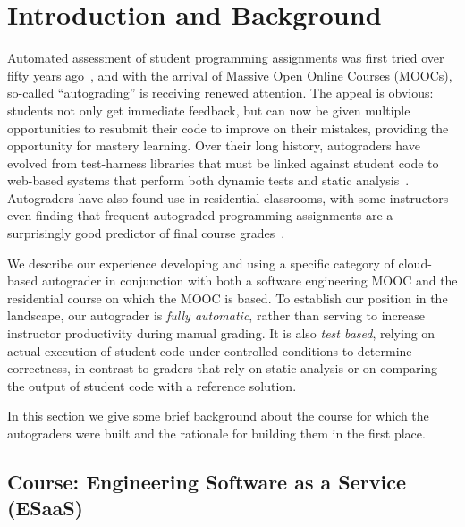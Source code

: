 \section{Introduction and Background}

Automated assessment of student programming assignments was first tried
over fifty years ago~\cite{hollingsworth60}, and with the arrival of
Massive Open Online Courses (MOOCs), so-called ``autograding'' is
receiving renewed attention.  The appeal is obvious: students not only
get immediate feedback, but can now be given multiple opportunities to
resubmit their code to improve on their mistakes, providing the
opportunity for mastery learning.  Over their long history, autograders
have evolved from test-harness libraries that must be linked against
student code to web-based systems that perform both dynamic tests and static
analysis~\cite{douce-2005-autograding-survey}.  Autograders have also
found use in residential classrooms, with some instructors even finding
that frequent autograded programming assignments are a surprisingly good
predictor of final course grades~\cite{navrat2014}.

We describe our experience developing and using a specific category of
cloud-based autograder in conjunction with both a software engineering
MOOC and the residential course on which the MOOC is based.  To
establish our position in the landscape, our autograder is \emph{fully
automatic}, rather than serving to increase instructor productivity
during manual grading.  It is also \emph{test based}, relying on actual
execution of student code under controlled conditions to determine
correctness, in contrast to graders that rely on static analysis or on
comparing the output of student code with a reference solution.

In this section we give some brief background about the course for which
the autograders were built and the rationale for building them in the
first place.

\subsection{Course: Engineering Software as a Service (ESaaS)}

